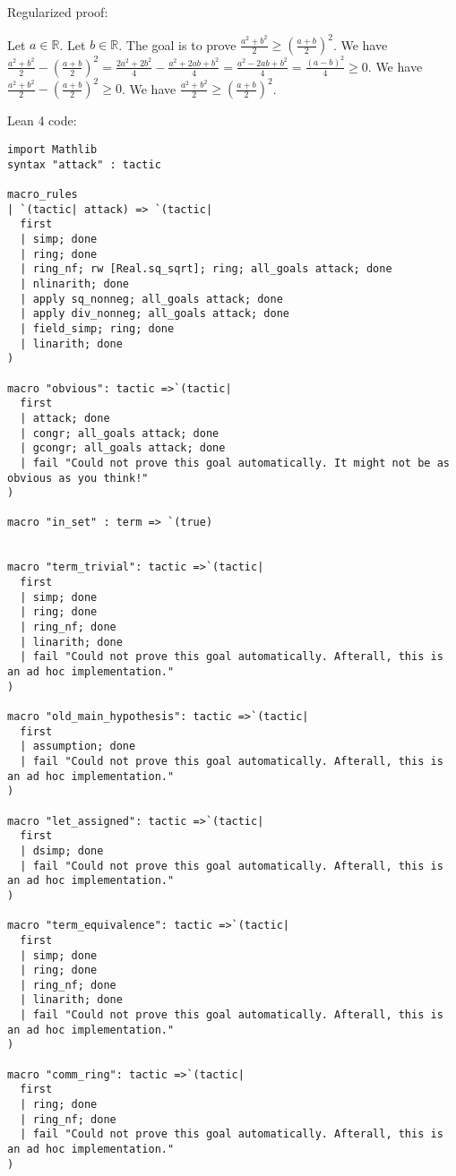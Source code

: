 \documentclass{article}
\begin{document}
Regularized proof:
\begin{tcolorbox}[colback=red!10, width=\linewidth]
Let $a\in\mathbb{R}$.
Let $b\in\mathbb{R}$.
The goal is to prove $\frac{a^2+b^2}{2} \ge {\left(\frac{a+b}{2}\right)}^2$.
We have $\frac{a^2+b^2}{2} - {\left(\frac{a+b}{2}\right)}^2 = \frac{2a^2+2b^2}{4} - \frac{a^2+2ab+b^2}{4} = \frac{a^2-2ab+b^2}{4} = \frac{{{(a-b)}}^2}{4} \ge 0$.
We have $\frac{a^2+b^2}{2} - {\left(\frac{a+b}{2}\right)}^2 \ge 0$.
We have $\frac{a^2+b^2}{2} \ge {\left(\frac{a+b}{2}\right)}^2$.
\end{tcolorbox}

Lean 4 code:
\begin{tcolorbox}[colback=white!10, width=\linewidth]
\begin{lstlisting}[language=Lean4]
import Mathlib
syntax "attack" : tactic

macro_rules
| `(tactic| attack) => `(tactic|
  first
  | simp; done
  | ring; done
  | ring_nf; rw [Real.sq_sqrt]; ring; all_goals attack; done
  | nlinarith; done
  | apply sq_nonneg; all_goals attack; done
  | apply div_nonneg; all_goals attack; done
  | field_simp; ring; done
  | linarith; done
)

macro "obvious": tactic =>`(tactic|
  first
  | attack; done
  | congr; all_goals attack; done
  | gcongr; all_goals attack; done
  | fail "Could not prove this goal automatically. It might not be as obvious as you think!"
)

macro "in_set" : term => `(true)


macro "term_trivial": tactic =>`(tactic|
  first
  | simp; done
  | ring; done
  | ring_nf; done
  | linarith; done
  | fail "Could not prove this goal automatically. Afterall, this is an ad hoc implementation."
)

macro "old_main_hypothesis": tactic =>`(tactic|
  first
  | assumption; done
  | fail "Could not prove this goal automatically. Afterall, this is an ad hoc implementation."
)

macro "let_assigned": tactic =>`(tactic|
  first
  | dsimp; done
  | fail "Could not prove this goal automatically. Afterall, this is an ad hoc implementation."
)

macro "term_equivalence": tactic =>`(tactic|
  first
  | simp; done
  | ring; done
  | ring_nf; done
  | linarith; done
  | fail "Could not prove this goal automatically. Afterall, this is an ad hoc implementation."
)

macro "comm_ring": tactic =>`(tactic|
  first
  | ring; done
  | ring_nf; done
  | fail "Could not prove this goal automatically. Afterall, this is an ad hoc implementation."
)


\end{lstlisting}
\end{tcolorbox}
\end{document}
